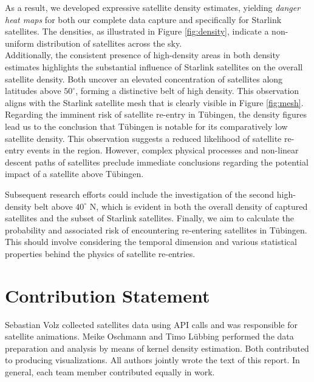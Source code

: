 \documentclass{article}
\theoremstyle{plain}
\theoremstyle{definition}
\theoremstyle{remark}
\begin{document}
As a result, we developed expressive satellite density estimates, yielding \textit{danger heat maps} for both our complete data capture and specifically for Starlink satellites. The densities, as illustrated in Figure \ref{fig:density}, indicate a non-uniform distribution of satellites across the sky.\\
Additionally, the consistent presence of high-density areas in both density estimates highlights the substantial influence of Starlink satellites on the overall satellite density.
Both uncover an elevated concentration of satellites along latitudes above $50^\circ$, forming a distinctive belt of high density. This observation aligns with the Starlink satellite mesh that is clearly visible in Figure \ref{fig:mesh}. \\
Regarding the imminent risk of satellite re-entry in Tübingen, the density figures lead us to the conclusion that Tübingen is notable for its comparatively low satellite density. This observation suggests a reduced likelihood of satellite re-entry events in the region. However, complex physical processes and non-linear descent paths of satellites preclude immediate conclusions regarding the potential impact of a satellite above Tübingen.

Subsequent research efforts could include the investigation of the second high-density belt above $40^\circ$ N, which is evident in both the overall density of captured satellites and the subset of Starlink satellites. Finally, we aim to calculate the probability and associated risk of encountering re-entering satellites in Tübingen. This should involve considering the temporal dimension and various statistical properties behind the physics of satellite re-entries.


\section*{Contribution Statement}
Sebastian Volz collected satellites data using API calls and was responsible for satellite animations. Meike Oschmann and Timo Lübbing performed the data preparation and analysis by means of kernel density estimation. Both contributed to producing visualizations. All authors jointly wrote the text of this report. In general, each team member contributed equally in work. 


\newpage



\end{document}
